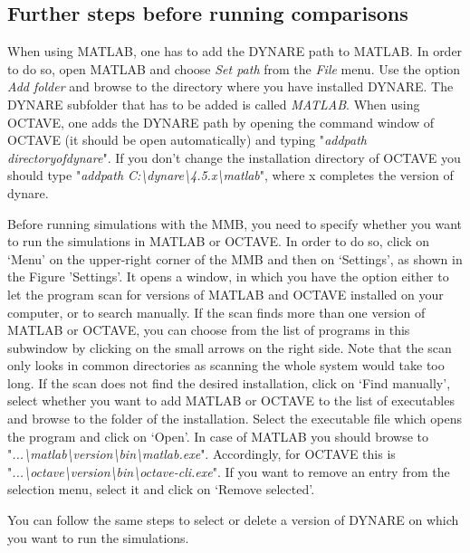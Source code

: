 \subsection*{Further steps before running comparisons}
When using MATLAB, one has to add the DYNARE path to MATLAB. In order to do so, open MATLAB and choose \textit{Set path} from the \textit{File} menu. Use the option \textit{Add folder} and browse to the directory where you have installed DYNARE. The DYNARE subfolder that has to be added is called \textit{MATLAB}.
When using OCTAVE, one adds the DYNARE path by opening the command window of OCTAVE (it should be open automatically) and typing "\textit{addpath directoryofdynare}". If you don't change the installation directory of OCTAVE you should type "\textit{addpath C:\textbackslash dynare\textbackslash 4.5.x\textbackslash matlab}", where x completes the version of dynare.   

Before running simulations with the MMB, you need to specify whether you want to run the simulations in MATLAB or OCTAVE. In order to do so, click on `Menu' on the upper-right corner of the MMB and then on `Settings', as shown in the Figure 'Settings'. It opens a window, in which you have the option either to let the program scan for versions of MATLAB and OCTAVE installed on your computer, or to search manually. If the scan finds more than one version of MATLAB or OCTAVE, you can choose from the list of programs in this subwindow by clicking on the small arrows on the right side. Note that the scan only looks in common directories as scanning the whole system would take too long. If the scan does not find the desired installation, click on `Find manually', select whether you want to add MATLAB or OCTAVE to the list of executables  and browse to the folder of the installation. Select the executable file which opens the program and click on `Open'. In case of MATLAB you should browse to "\textit{...\textbackslash matlab\textbackslash version\textbackslash bin\textbackslash matlab.exe}". Accordingly, for OCTAVE this is "\textit{...\textbackslash octave\textbackslash version\textbackslash bin\textbackslash octave-cli.exe}". If you want to remove an entry from the selection menu, select it and click on `Remove selected'.

You can follow the same steps  to select or delete a version of DYNARE on which you want to run the simulations.

